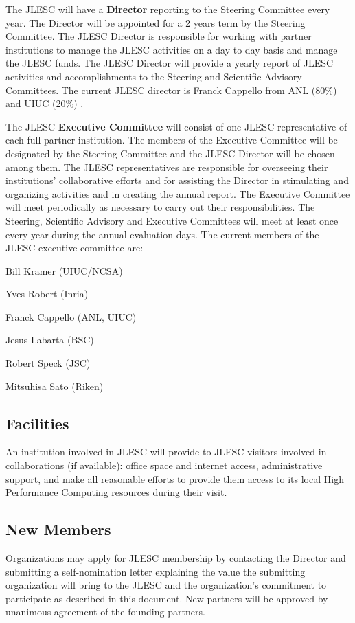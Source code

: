 \documentclass[12pt]{article}
\theoremstyle{definition}
\begin{document}
The JLESC will have a \textbf{Director} reporting to the Steering Committee every year. The Director will be appointed for a 2 years term by the Steering Committee. The JLESC Director is responsible for working with partner institutions to manage the JLESC activities on a day to day basis and manage the JLESC funds.  The JLESC Director will provide a yearly report of JLESC activities and accomplishments to the Steering and Scientific Advisory Committees. The current JLESC director is Franck Cappello from ANL (80\%) and UIUC (20\%) .
\bigskip

The JLESC \textbf{Executive Committee} will consist of one JLESC representative of each full partner institution. The members of the Executive Committee will be designated by the Steering Committee and the JLESC Director will be chosen among them. The JLESC representatives are responsible for overseeing their institutions' collaborative efforts and for assisting the Director in stimulating and organizing activities and in creating the annual report. 
The Executive Committee will meet periodically as necessary to carry out their responsibilities. The Steering, Scientific Advisory and Executive Committees will meet at least once every year during the annual evaluation days. The current members of the JLESC executive committee are:
\begin{compactenum}
\item Bill Kramer (UIUC/NCSA)
\item Yves Robert (Inria)
\item Franck Cappello (ANL, UIUC)
\item Jesus Labarta (BSC)
\item Robert Speck (JSC)
\item Mitsuhisa Sato (Riken)
\end{compactenum}

\subsection{Facilities} 
An institution involved in JLESC will provide to JLESC visitors involved in collaborations (if available): office space and internet access, administrative support, and make all reasonable efforts to provide them access to its local High Performance Computing resources during their visit.

\subsection{New Members} 
Organizations may apply for JLESC membership by contacting the Director and submitting a self-nomination letter explaining the value the submitting organization will bring to the JLESC and the organization's commitment to participate as described in this document.  New partners will be approved by unanimous agreement of the founding partners. 
\end{document}
